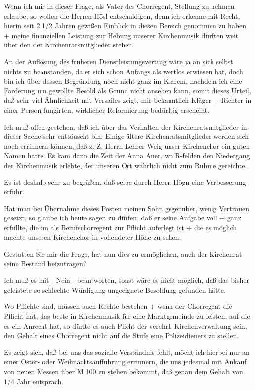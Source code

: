 \documentclass{book}
\begin{document}
Wenn ich mir in dieser Frage, als Vater des Chorregent, Stellung zu nehmen
erlaube, so wollen die Herren Hösl entschuldigen, denn ich erkenne mit Recht,
hierin seit 2 1/2 Jahren gewißen Einblick in diesen Bereich genommen zu haben +
meine finanziellen Leistung zur Hebung unserer Kirchenmusik dürften weit über
den der Kirchenratsmitglieder stehen.

An der Auflösung des früheren Dienstleistungsvertrag wäre ja an sich selbst
nichts zu beanstanden, da er sich schon Anfangs als wertlos erwiesen hat, doch
bin ich über dessen Begründung noch nicht ganz im Klarem, nachdem ich eine
Forderung um gewollte Besold als Grund nicht ansehen kann, somit dieses Urteil,
daß sehr viel Ähnlichkeit mit Versailes zeigt, mir bekanntlich Kläger + Richter
in einer Person fungirten, wirklicher Reformierung bedürftig erscheint.

Ich muß offen gestehen, daß ich über das Verhalten der Kirchenratsmitglieder in
dieser Sache sehr enttäuscht bin. Einige ältere Kirchenratsmitglieder werden
sich noch errinnern können, daß z. Z. Herrn Lehrer Weig unser Kirchenchor ein
guten Namen hatte. Es kam dann die Zeit der Anna Auer, wo R-felden den
Niedergang der Kirchenmusik erlebte, der unseren Ort wahrlich nicht zum Ruhme
gereichte.

Es ist deshalb sehr zu begrüßen, daß selbe durch Herrn Högn eine Verbesserung
erfuhr.

Hat man bei Übernahme dieses Posten meinen Sohn gegenüber, wenig Vertrauen
gesetzt, so glaube ich heute sagen zu dürfen, daß er seine Aufgabe voll + ganz
erfüllte, die im als Berufschorregent zur Pflicht auferlegt ist + die es möglich
machte unseren Kirchenchor in vollendeter Höhe zu sehen.

Gestatten Sie mir die Frage, hat nun dies zu ermöglichen, auch der Kirchenrat
seine Bestand beizutragen?

Ich muß es mit - Nein - beantworten, sonst wäre es nicht möglich, daß das bisher
geleistete so schlechte Würdigung ungeeignete Besoldung gefunden hätte.

Wo Pflichte sind, müssen auch Rechte bestehen + wenn der Chorregent die Pflicht
hat, das beste in Kirchenmusik für eine Marktgemeinde zu leisten, auf die es ein
Anrecht hat, so dürfte es auch Plicht der verehrl. Kirchenverwaltung sein, den
Gehalt eines Chorregent nicht auf die Stufe eine Polizeidieners zu stellen.

Es zeigt sich, daß bei uns das sozialle Verständnis fehlt, möcht ich hierbei nur
an einer Oster- oder Weihnachtsaufführung errinnern, die uns jedesmal mit Ankauf
von neuen Messen über M 100 zu stehen bekommt, daß genau dem Gehalt von 1/4 Jahr
entsprach.
\end{document}
